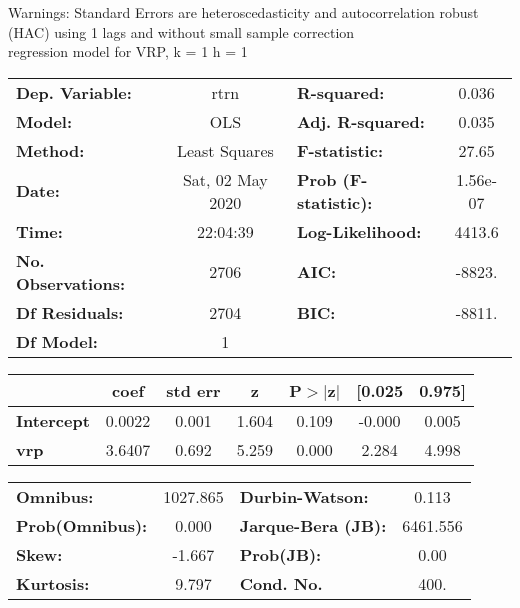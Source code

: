 Warnings: \newline
 [1] Standard Errors are heteroscedasticity and autocorrelation robust (HAC) using 1 lags and without small sample correction\\ 

regression model for VRP, k = 1 h = 1\begin{center}
\begin{tabular}{lclc}
\toprule
\textbf{Dep. Variable:}    &       rtrn       & \textbf{  R-squared:         } &     0.036   \\
\textbf{Model:}            &       OLS        & \textbf{  Adj. R-squared:    } &     0.035   \\
\textbf{Method:}           &  Least Squares   & \textbf{  F-statistic:       } &     27.65   \\
\textbf{Date:}             & Sat, 02 May 2020 & \textbf{  Prob (F-statistic):} &  1.56e-07   \\
\textbf{Time:}             &     22:04:39     & \textbf{  Log-Likelihood:    } &    4413.6   \\
\textbf{No. Observations:} &        2706      & \textbf{  AIC:               } &    -8823.   \\
\textbf{Df Residuals:}     &        2704      & \textbf{  BIC:               } &    -8811.   \\
\textbf{Df Model:}         &           1      & \textbf{                     } &             \\
\bottomrule
\end{tabular}
\begin{tabular}{lcccccc}
                   & \textbf{coef} & \textbf{std err} & \textbf{z} & \textbf{P$> |$z$|$} & \textbf{[0.025} & \textbf{0.975]}  \\
\midrule
\textbf{Intercept} &       0.0022  &        0.001     &     1.604  &         0.109        &       -0.000    &        0.005     \\
\textbf{vrp}       &       3.6407  &        0.692     &     5.259  &         0.000        &        2.284    &        4.998     \\
\bottomrule
\end{tabular}
\begin{tabular}{lclc}
\textbf{Omnibus:}       & 1027.865 & \textbf{  Durbin-Watson:     } &    0.113  \\
\textbf{Prob(Omnibus):} &   0.000  & \textbf{  Jarque-Bera (JB):  } & 6461.556  \\
\textbf{Skew:}          &  -1.667  & \textbf{  Prob(JB):          } &     0.00  \\
\textbf{Kurtosis:}      &   9.797  & \textbf{  Cond. No.          } &     400.  \\
\bottomrule
\end{tabular}
\end{center}


